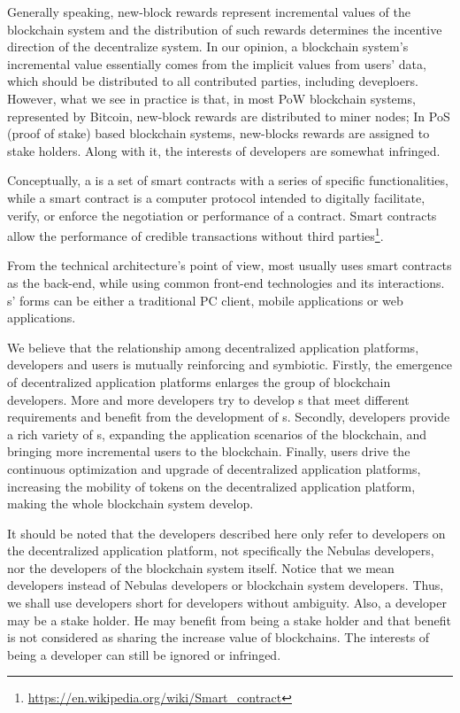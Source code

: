 Generally speaking,  new-block rewards represent incremental values of the blockchain system and the distribution of such rewards determines the incentive direction of the decentralize system. In our opinion, a blockchain system's incremental value essentially comes from the implicit values from users' data, which should be distributed to all contributed parties, including \dapp deveploers. However, what we see in practice is that, in most PoW blockchain systems, represented by Bitcoin, new-block rewards are distributed to miner nodes; In PoS (proof of stake) based blockchain systems, new-blocks rewards are assigned to  stake holders. Along with it, the interests of \dapp developers are somewhat infringed.


Conceptually, a \dapp is a set of smart contracts with a series of specific
functionalities, while a smart contract is a computer protocol intended to
digitally facilitate, verify, or enforce the negotiation or performance of a
contract. Smart contracts allow the performance of credible transactions
without third
parties\footnote{\url{https://en.wikipedia.org/wiki/Smart\_contract}}.

From the technical architecture's point of view, most \dapp usually uses smart contracts as the back-end, while using common front-end technologies and its interactions. {\dapp}s' forms can be either a traditional PC client, mobile applications or web applications.

We believe that the relationship among decentralized application platforms, \dapp developers and \dapp users is mutually reinforcing and symbiotic. Firstly, the emergence of decentralized application platforms enlarges the group of blockchain developers. More and more developers try to develop {\dapp}s that meet different requirements and benefit from the development of {\dapp}s. Secondly, \dapp developers provide a rich variety of {\dapp}s, expanding the application scenarios of the blockchain, and bringing more incremental users to the blockchain. Finally, \dapp users drive the continuous optimization and upgrade of decentralized application platforms, increasing the mobility of tokens on the decentralized application platform, making the whole blockchain system develop.

It should be noted that the developers described here only refer to developers on the decentralized application platform, not specifically the Nebulas developers, nor the developers of the blockchain system itself.
Notice that we mean \dapp developers instead of Nebulas \dapp developers or
blockchain system developers. Thus, we shall use developers short for \dapp
developers without ambiguity. Also, a \dapp developer may be a stake holder.
He may benefit from being a stake holder and that benefit is not considered
as sharing the increase value of blockchains. The interests of being a developer can still be ignored or infringed.


